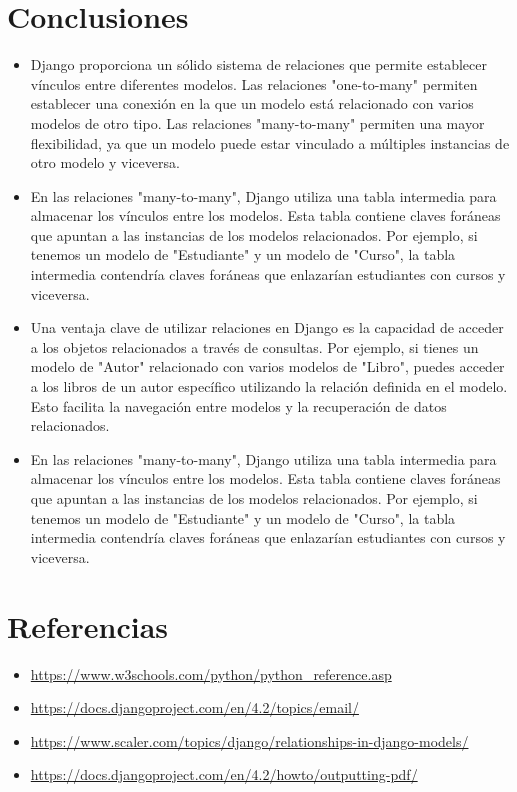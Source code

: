 \documentclass{article}
\begin{document}
 \section{Conclusiones}
	\begin{itemize}
		\item Django proporciona un sólido sistema de relaciones que permite establecer vínculos entre diferentes modelos. Las relaciones "one-to-many" permiten establecer una conexión en la que un modelo está relacionado con varios modelos de otro tipo. Las relaciones "many-to-many" permiten una mayor flexibilidad, ya que un modelo puede estar vinculado a múltiples instancias de otro modelo y viceversa.
            \item En las relaciones "many-to-many", Django utiliza una tabla intermedia para almacenar los vínculos entre los modelos. Esta tabla contiene claves foráneas que apuntan a las instancias de los modelos relacionados. Por ejemplo, si tenemos un modelo de "Estudiante" y un modelo de "Curso", la tabla intermedia contendría claves foráneas que enlazarían estudiantes con cursos y viceversa.
            \item Una ventaja clave de utilizar relaciones en Django es la capacidad de acceder a los objetos relacionados a través de consultas. Por ejemplo, si tienes un modelo de "Autor" relacionado con varios modelos de "Libro", puedes acceder a los libros de un autor específico utilizando la relación definida en el modelo. Esto facilita la navegación entre modelos y la recuperación de datos relacionados.
            \item En las relaciones "many-to-many", Django utiliza una tabla intermedia para almacenar los vínculos entre los modelos. Esta tabla contiene claves foráneas que apuntan a las instancias de los modelos relacionados. Por ejemplo, si tenemos un modelo de "Estudiante" y un modelo de "Curso", la tabla intermedia contendría claves foráneas que enlazarían estudiantes con cursos y viceversa.
	\end{itemize}	
\clearpage

\section{Referencias}
\begin{itemize}	
    \item \url{https://www.w3schools.com/python/python_reference.asp}
    \item \url{https://docs.djangoproject.com/en/4.2/topics/email/}
    \item \url{https://www.scaler.com/topics/django/relationships-in-django-models/}
    \item \url{https://docs.djangoproject.com/en/4.2/howto/outputting-pdf/}
\end{itemize}	
	
%
%
%
			
\end{document}
